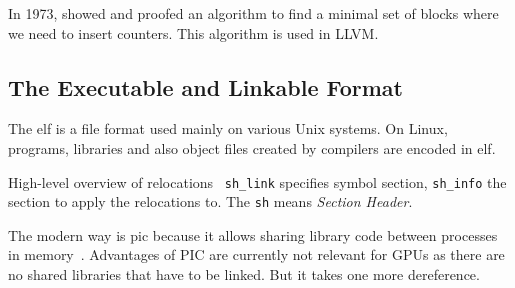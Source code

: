 In 1973, \citet{Knuth1973} showed and proofed an algorithm to find a minimal set of blocks where we need to insert counters. This algorithm is used in LLVM.

\subsection{The Executable and Linkable Format}
\label{sub:elf}
The \gls{elf} is a file format used mainly on various Unix systems. On Linux, programs, libraries and also object files created by compilers are encoded in \gls{elf}.

High-level overview of relocations~\cite{BenderskyRelocations}
\texttt{sh\_link} specifies symbol section, \texttt{sh\_info} the section to apply the relocations to. The \texttt{sh} means \emph{Section Header}.

The modern way is \gls{pic} because it allows sharing library code between processes in memory~\cite{BenderskyPic}. Advantages of PIC are currently not relevant for GPUs as there are no shared libraries that have to be linked. But it takes one more dereference.